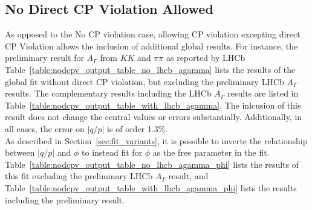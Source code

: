 \subsection{No Direct CP Violation Allowed}
As opposed to the No CP violation case, allowing CP violation excepting direct CP Violation
allows the inclusion of additional global results. For instance, the preliminary result 
for $A_\Gamma$ from $KK$ and $\pi\pi$ as reported by LHCb
Table~\ref{table:nodcpv_output_table_no_lhcb_agamma} lists the results of the global fit without direct
CP violation, but excluding the preliminary LHCb $A_\Gamma$ results.
The complementary results including the LHCb $A_\Gamma$ results are listed in
Table~\ref{table:nodcpv_output_table_with_lhcb_agamma}.
The inlcusion of this result does not change the central values or errors substantially. 
Additionally, in all cases, the error on $|q/p|$ is of order 1.3\%.\\
As described in Section~\ref{sec:fit_variants}, it is possible to inverte the relationship
 between $|q/p|$ and $\phi$ to instead fit for $\phi$ as the free parameter in the fit. 
Table~\ref{table:nodcpv_output_table_no_lhcb_agamma_phi} lists the results of this fit 
excluding the preliminary LHCb $A_\Gamma$ result, and Table~\ref{table:nodcpv_output_table_with_lhcb_agamma_phi} 
lists the results including the preliminary result.

